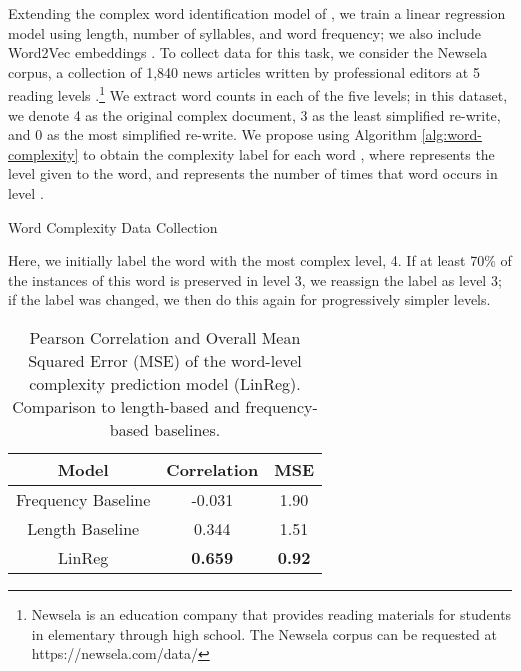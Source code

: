 \documentclass[11pt,a4paper]{article}
\begin{document}
Extending the complex word identification model of , we train a linear regression model using length, number of syllables, and word frequency; we also include Word2Vec embeddings \cite{mikolov2013distributed}. To collect data for this task, we consider the Newsela corpus, a collection of 1,840 news articles written by professional editors at 5 reading levels \cite{xu2015problems}.\footnote{Newsela is an education company that provides reading materials for students in elementary through high school. The Newsela corpus can be requested at https://newsela.com/data/} We extract word counts in each of the five levels; in this dataset, we denote 4 as the original complex document, 3 as the least simplified re-write, and 0 as the most simplified re-write. We propose using Algorithm \ref{alg:word-complexity} to obtain the complexity label for each word , where  represents the level given to the word, and  represents the number of times that word occurs in level .

\begin{algorithm}
\caption{Word Complexity Data Collection}
\label{alg:word-complexity}

\begin{algorithmic}[1]
\State  
\For{}
    \If{}
        \If{}
            \State 
        \EndIf
    \EndIf
\EndFor

\Return 
\EndProcedure
\end{algorithmic}
\end{algorithm}

Here, we initially label the word with the most complex level, 4. If at least 70\% of the instances of this word is preserved in level 3, we reassign the label as level 3; if the label was changed, we then do this again for progressively simpler levels.

\begin{table}
\begin{center}
\begin{tabular}{|c|c|c|} \hline
\textbf{Model} & \textbf{Correlation} & \textbf{MSE} \\ \hline
Frequency Baseline & -0.031 & 1.90 \\
Length Baseline & 0.344 & 1.51 \\
LinReg & \textbf{0.659} & \textbf{0.92} \\ \hline
\end{tabular}
\end{center}
\caption{\label{word-comp} Pearson Correlation and Overall Mean Squared Error (MSE) of the word-level complexity prediction model (LinReg). Comparison to length-based and frequency-based baselines.}
\end{table}
\end{document}
